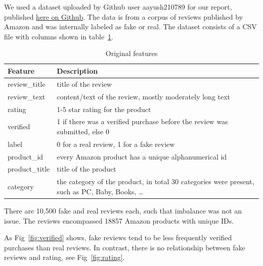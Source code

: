 \documentclass[utf8x]{ctexart}
\begin{document}
We used a dataset uploaded by Github user aayush210789 for our report, published \href{https://github.com/aayush210789/Deception-Detection-on-Amazon-reviews-dataset}{here on Github}. The data is from a corpus of reviews published by Amazon and was internally labeled as fake or real.
The dataset consists of a CSV file with columns shown in table~\ref{tab:feat1}.
\begin{table}[ht]
  \centering
  \caption{Original features}
  \label{tab:feat1}
  \begin{tabular}{l p{6cm}}
    Feature        & Description                                                                                      \\
    \hline
    review\_title  & title of the review                                                                              \\

    review\_text   & content/text of the review, mostly moderately long text                                          \\

    rating         & 1-5 star rating for the product                                                                  \\

    verified       & 1 if there was a verified purchase before the review was submitted, else 0                       \\

    label          & 0 for a real review, 1 for a fake review                                                         \\
    product\_id    & every Amazon product has a unique alphanumerical id                                              \\
    product\_title & title of the product                                                                             \\
    category       & the category of the product, in total 30 categories were present, such as PC, Baby, Books, \dots \\
  \end{tabular}
\end{table}

There are 10,500 fake and real reviews each, such that imbalance was not an issue.
The reviews encompassed 18857 Amazon products with unique IDs.

As Fig~\ref{fig:verified} shows, fake reviews tend to be less frequently verified purchases than real reviews. In contrast, there is no relationship between fake reviews and rating, see Fig~\ref{fig:rating}.
\end{document}
